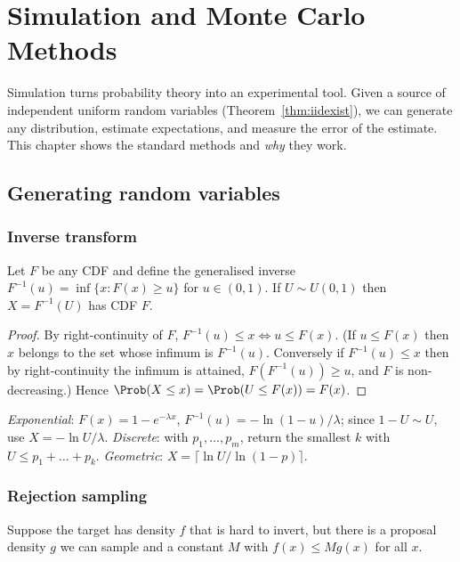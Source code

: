 \chapter{Simulation and Monte Carlo Methods}
\label{ch:sim}

Simulation turns probability theory into an experimental tool. Given a source of
independent uniform random variables (Theorem~\ref{thm:iidexist}), we can generate any
distribution, estimate expectations, and measure the error of the estimate. This chapter
shows the standard methods and \emph{why} they work.

\section{Generating random variables}

\subsection{Inverse transform}

\begin{theorem}\label{thm:invtransform}
Let $F$ be any CDF and define the generalised inverse
$F^{-1}(u)=\inf\{x:F(x)\ge u\}$ for $u\in(0,1)$. If $U\sim U(0,1)$ then $X=F^{-1}(U)$ has CDF $F$.
\end{theorem}
\begin{proof}
By right-continuity of $F$, $F^{-1}(u)\le x\iff u\le F(x)$. (If $u\le F(x)$ then $x$ belongs to
the set whose infimum is $F^{-1}(u)$. Conversely if $F^{-1}(u)\le x$ then by
right-continuity the infimum is attained, $F(F^{-1}(u))\ge u$, and $F$ is non-decreasing.)
Hence $\Prob(X\le x)=\Prob(U\le F(x))=F(x)$.
\end{proof}

\begin{example}
\emph{Exponential}: $F(x)=1-e^{-\lambda x}$, $F^{-1}(u)=-\ln(1-u)/\lambda$; since $1-U\sim U$, use
$X=-\ln U/\lambda$. \emph{Discrete}: with $p_1,\dots,p_m$, return the smallest $k$ with
$U\le p_1+\dots+p_k$. \emph{Geometric}: $X=\lceil\ln U/\ln(1-p)\rceil$.
\end{example}

\subsection{Rejection sampling}

Suppose the target has density $f$ that is hard to invert, but there is a proposal
density $g$ we can sample and a constant $M$ with $f(x)\le Mg(x)$ for all $x$.

